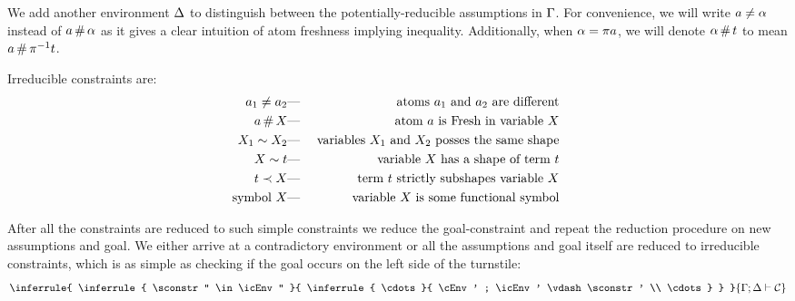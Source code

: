 \documentclass[english, mgr]{iithesis}
\begin{document}
We add another environment $\Delta$ to distinguish between the potentially-reducible assumptions in $\Gamma$.
For convenience, we will write $a \neq \alpha$ instead of $a \,\#\, \alpha$ as it gives a clear intuition of atom freshness implying inequality.
Additionally, when $\alpha = \pi a$, we will denote $\alpha \,\#\, t$ to mean $a \,\#\, \pi^{-1} t$.

Irreducible constraints are:
\begin{eqnarray*}
  a_1 \neq a_2 & \text{---} & \text{
    atoms $a_1$ and $a_2$ are different
  } \\
  a   \,\#\, X   & \text{---} & \text{
    atom $a$ is {Fresh} in variable $X$
  } \\
  X_1 \sim  X_2 & \text{---} & \text{
    variables $X_1$ and $X_2$ posses the same shape
  } \\
  X   \sim  t    & \text{---} & \text{
    variable $X$ has a shape of term $t$
  } \\
  t    \prec  X   & \text{---} & \text{
    term $t$ strictly subshapes variable $X$
  } \\
  \text{symbol }  X   & \text{---} & \text{
    variable $X$ is some functional symbol
  } \\
\end{eqnarray*}
\newcommand{\solverRule}{\vdash}

After all the constraints are reduced to such simple constraints
we reduce the goal-constraint and repeat the reduction procedure on
new assumptions and goal. We either arrive at a contradictory environment or
all the assumptions and goal itself are reduced to irreducible constraints, which
is as simple as checking if the goal occurs on the left side of the turnstile:
$$
\inferrule{
  \inferrule{
    \sconstr'' \in \icEnv''
    }{
    \inferrule{
     \cdots
    }{
     \cEnv' ; \icEnv' \solverRule \sconstr' \\ \cdots
  }
  }
}{
  \cEnv ; \icEnv \solverRule \sconstr
}
$$
\end{document}
